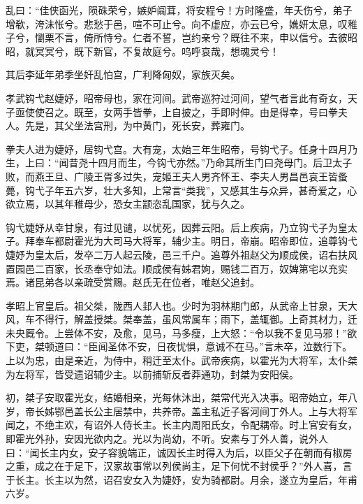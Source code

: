 \documentclass[12pt,UTF8]{ctexbook}
\begin{document}
乱曰：“佳侠函光，陨硃荣兮，嫉妒阘茸，将安程兮！方时隆盛，年夭伤兮，弟子增欷，洿沬怅兮。悲愁于邑，喧不可止兮。向不虚应，亦云已兮，嫶妍太息，叹稚子兮，懰栗不言，倚所恃兮。仁者不誓，岂约亲兮？既往不来，申以信兮。去彼昭昭，就冥冥兮，既下新官，不复故庭兮。呜呼哀哉，想魂灵兮！



其后李延年弟季坐奸乱怕宫，广利降匈奴，家族灭矣。



孝武钩弋赵婕妤，昭帝母也，家在河间。武帝巡狩过河间，望气者言此有奇女，天子亟使使召之。既至，女两手皆拳，上自披之，手即时伸。由是得幸，号曰拳夫人。先是，其父坐法宫刑，为中黄门，死长安，葬雍门。



拳夫人进为婕妤，居钩弋宫。大有宠，太始三年生昭帝，号钩弋子。任身十四月乃生，上曰：“闻昔尧十四月而生，今钩弋亦然。”乃命其所生门曰尧母门。后卫太子败，而燕王旦、广陵王胥多过失，宠姬王夫人男齐怀王、李夫人男昌邑哀王皆蚤薨，钩弋子年五六岁，壮大多知，上常言“类我”，又感其生与众异，甚奇爱之，心欲立焉，以其年稚母少，恐女主颛恣乱国家，犹与久之。



钩弋婕妤从幸甘泉，有过见谴，以忧死，因葬云阳。后上疾病，乃立钩弋子为皇太子。拜奉车都尉霍光为大司马大将军，辅少主。明日，帝崩。昭帝即位，追尊钩弋婕妤为皇太后，发卒二万人起云陵，邑三千户。追尊外祖赵父为顺成侯，诏右扶风置园邑二百家，长丞奉守如法。顺成侯有姊君姁，赐钱二百万，奴婢第宅以充实焉。诸昆弟各以亲疏受赏赐。赵氏无在位者，唯赵父追封。



孝昭上官皇后。祖父桀，陇西人邽人也。少时为羽林期门郎，从武帝上甘泉，天大风，车不得行，解盖授桀。桀奉盖，虽风常属车；雨下，盖辄御。上奇其材力，迁未央厩令。上尝体不安，及愈，见马，马多瘦，上大怒：“令以我不复见马邪！”欲下吏，桀顿道曰：“臣闻圣体不安，日夜忧惧，意诚不在马。”言未卒，泣数行下。上以为忠，由是亲近，为侍中，稍迁至太仆。武帝疾病，以霍光为大将军，太仆桀为左将军，皆受遗诏辅少主。以前捕斩反者莽通功，封桀为安阳侯。



初，桀子安取霍光女，结婚相亲，光每休沐出，桀常代光入决事。昭帝始立，年八岁，帝长姊鄂邑盖长公主居禁中，共养帝。盖主私近子客河间丁外人。上与大将军闻之，不绝主欢，有诏外人侍长主。长主内周阳氏女，令配耦帝。时上官安有女，即霍光外孙，安因光欲内之。光以为尚幼，不听。安素与丁外人善，说外人曰：“闻长主内女，安子容貌端正，诚因长主时得入为后，以臣父子在朝而有椒房之重，成之在于足下，汉家故事常以列侯尚主，足下何忧不封侯乎？”外人喜，言于长主。长主以为然，诏召安女入为婕妤，安为骑都尉。月余，遂立为皇后，年甫六岁。
\end{document}
